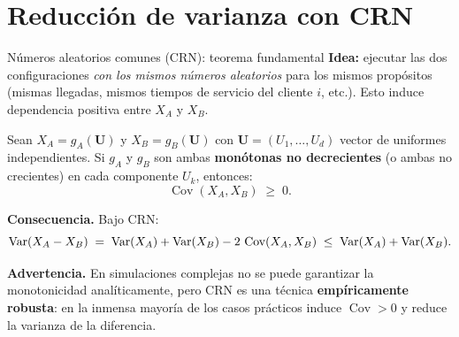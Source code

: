 \documentclass[aspectratio=1610, 10pt]{beamer}
\newcommand{\Cov}{\operatorname{Cov}}
\begin{document}
\section{Reducción de varianza con CRN}

\begin{frame}{Números aleatorios comunes (CRN): teorema fundamental}
\textbf{Idea:} ejecutar las dos configuraciones \emph{con los mismos números aleatorios} para los mismos propósitos (mismas llegadas, mismos tiempos de servicio del cliente $i$, etc.). Esto induce dependencia positiva entre $X_A$ y $X_B$.

\vspace{0.2cm}
\begin{teoremabox}
Sean $X_A = g_A(\mathbf U)$ y $X_B = g_B(\mathbf U)$ con $\mathbf U = (U_1,\ldots,U_d)$ vector de uniformes independientes. Si $g_A$ y $g_B$ son ambas \textbf{monótonas no decrecientes} (o ambas no crecientes) en cada componente $U_k$, entonces:
\[
\Cov(X_A, X_B) \;\geq\; 0.
\]
\end{teoremabox}

\textbf{Consecuencia.} Bajo CRN:
\[
\Var(X_A - X_B) \;=\; \Var(X_A) + \Var(X_B) - 2\,\Cov(X_A, X_B) \;\leq\; \Var(X_A) + \Var(X_B).
\]

\textbf{Advertencia.} En simulaciones complejas no se puede garantizar la monotonicidad analíticamente, pero CRN es una técnica \textbf{empíricamente robusta}: en la inmensa mayoría de los casos prácticos induce $\Cov > 0$ y reduce la varianza de la diferencia.
\end{frame}
\end{document}
